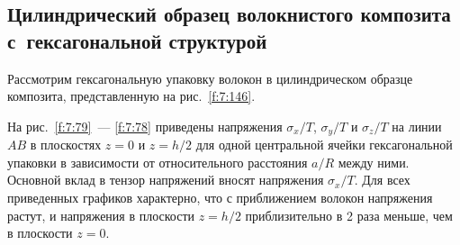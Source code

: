 %



\subsection{Цилиндрический образец волокнистого композита с~гексагональной структурой}

Рассмотрим гексагональную упаковку волокон  в цилиндрическом образце композита, представленную на рис.~\ref{f:7:146}.

На рис.~\ref{f:7:79}~--- \ref{f:7:78} приведены напряжения $\sigma_x/T$, $\sigma_y/T$ и $\sigma_z/T$ на линии $AB$ в плоскостях $z=0$ и $z=h/2$ для одной центральной ячейки гексагональной упаковки в зависимости от относительного расстояния $a/R$ между ними. Основной вклад в тензор напряжений вносят напряжения $\sigma_x/T$. Для всех приведенных графиков характерно, что с приближением волокон напряжения растут, и напряжения в плоскости $z=h/2$ приблизительно в 2 раза меньше, чем в плоскости $z=0$.

